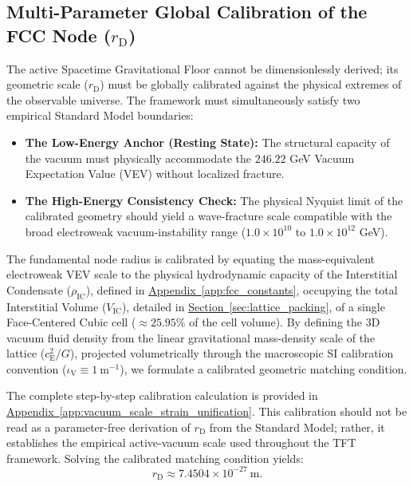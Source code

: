 \subsection{Multi-Parameter Global Calibration of the FCC Node ($r_{\mathrm{D}}$)}
The active Spacetime Gravitational Floor cannot be dimensionlessly derived; its geometric scale ($r_{\mathrm{D}}$) must be globally calibrated against the physical extremes of the observable universe. The framework must simultaneously satisfy two empirical Standard Model boundaries:

\begin{itemize}
    \item \textbf{The Low-Energy Anchor (Resting State):} The structural capacity of the vacuum must physically accommodate the $246.22$ GeV Vacuum Expectation Value (VEV) without localized fracture.
    \item \textbf{The High-Energy Consistency Check:} The physical Nyquist limit of the calibrated geometry should yield a wave-fracture scale compatible with the broad electroweak vacuum-instability range ($1.0 \times 10^{10}$ to $1.0 \times 10^{12}$ GeV).
\end{itemize}

The fundamental node radius is calibrated by equating the mass-equivalent electroweak VEV scale to the physical hydrodynamic capacity of the Interstitial Condensate ($\rho_{\mathrm{IC}}$), defined in \hyperref[app:fcc_constants]{Appendix~\ref*{app:fcc_constants}}, occupying the total Interstitial Volume ($V_{\mathrm{IC}}$), detailed in \hyperref[sec:lattice_packing]{Section~\ref*{sec:lattice_packing}}, of a single Face-Centered Cubic cell ($\approx 25.95\%$ of the cell volume). By defining the 3D vacuum fluid density from the linear gravitational mass-density scale of the lattice ($c_{\mathrm{E}}^2/G$), projected volumetrically through the macroscopic SI calibration convention ($\iota_{\mathrm{V}} \equiv 1~\mathrm{m}^{-1}$), we formulate a calibrated geometric matching condition.

The complete step-by-step calibration calculation is provided in \hyperref[app:vacuum_scale_strain_unification]{Appendix~\ref*{app:vacuum_scale_strain_unification}}. This calibration should not be read as a parameter-free derivation of $r_{\mathrm{D}}$ from the Standard Model; rather, it establishes the empirical active-vacuum scale used throughout the TFT framework. Solving the calibrated matching condition yields:
\begin{equation}
r_{\mathrm{D}} \approx 7.4504 \times 10^{-27}~\mathrm{m}.
\end{equation}


